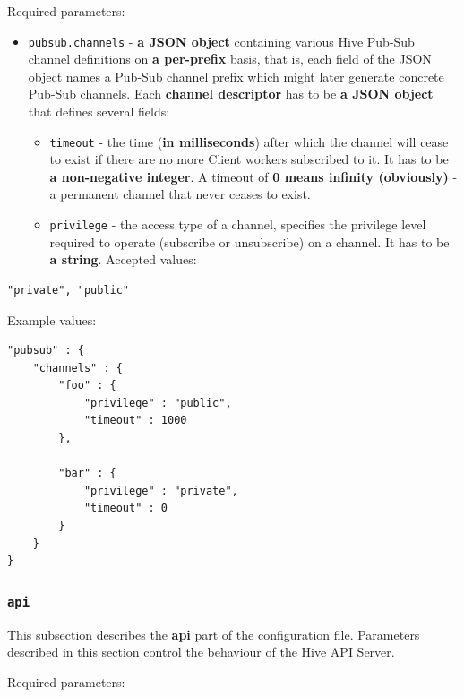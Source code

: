 \documentclass[a4paper]{article}
\begin{document}
\noindent
Required parameters:

\label{ref-pubsub_config}

\begin{itemize}
\item \texttt{pubsub.channels} - \textbf{a JSON object} containing various Hive Pub-Sub channel definitions on \textbf{a per-prefix} basis, that is, each field of the JSON object names a Pub-Sub channel prefix which might later generate concrete Pub-Sub channels. Each \textbf{channel descriptor} has to be \textbf{a JSON object} that defines several fields:
\begin{itemize}
\item \texttt{timeout} - the time (\textbf{in milliseconds}) after which the channel will cease to exist if there are no more Client workers subscribed to it. It has to be \textbf{a non-negative integer}. A timeout of \textbf{0 means infinity (obviously)} - a permanent channel that never ceases to exist.
\item \texttt{privilege} - the access type of a channel, specifies the privilege level required to operate (subscribe or unsubscribe) on a channel. It has to be \textbf{a string}. Accepted values:
\end{itemize}
\end{itemize}


\begin{verbatim}
"private", "public"
\end{verbatim}




\noindent
Example values:


\begin{verbatim}
"pubsub" : {
    "channels" : {
        "foo" : {
            "privilege" : "public",
            "timeout" : 1000
        },

        "bar" : {
            "privilege" : "private",
            "timeout" : 0
        }
    }
}
\end{verbatim}
\subsubsection{\texttt{api}}
\label{sec-3-1-6}
\label{ref-api_config}

This subsection describes the \textbf{api} part of the configuration file. Parameters described in this section control the behaviour of the Hive API Server.

\noindent
Required parameters:
\end{document}
